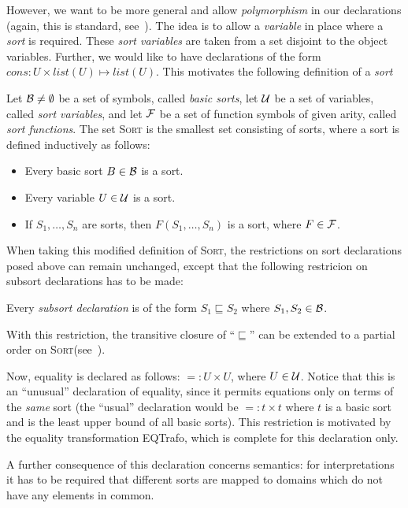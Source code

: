 \documentclass[fleqn]{scrartcl}
\newcommand{\eqtrafo}{\textsf{EQTrafo}\xspace}
\newcommand{\sort}{\textsc{Sort}\xspace}
\begin{document}
However, we want to be more general and allow
{\em polymorphism\/} in our declarations (again, this is standard,
see~\cite{Beierle}). 
The idea is to  allow a {\em variable\/}
in place where a {\em sort\/} is required. These {\em sort variables\/} are
taken from a set disjoint to the object variables. Further, we would
like to have declarations of the form $cons: U \times list(U) \mapsto
list(U)$. This motivates the following definition of a {\em sort\/}
\begin{definition}
Let $\cal B \neq \emptyset$  be a set of symbols, called {\em basic sorts\/}, let $\cal U$
be a set of variables, called {\em sort variables\/}, and let $\cal F$
be a set of function symbols 
of given arity, called {\em sort functions\/}. 
The set \sort is the smallest set consisting of sorts, where a sort
is defined inductively as follows:
\begin{itemize}
\item Every basic sort $B \in {\cal B}$ is a sort.
\item Every variable $U \in {\cal U}$ is a sort.
\item If $S_1,\ldots,S_n$ are sorts, then $F(S_1,\ldots,S_n)$ is a sort,
  where $F \in {\cal F}$.
\end{itemize}
\end{definition}

When taking this modified definition of \sort, the restrictions on
sort declarations posed above can remain unchanged, except 
that the following  restricion on subsort declarations has to be made:
\begin{description}
\item Every  {\em subsort declaration\/} is of the form $S_1
  \sqsubseteq S_2$ where $S_1,S_2 \in {\cal B}$.
\end{description}
With this restriction, the transitive closure of ``$\sqsubseteq$''
can be extended to a partial order on \sort (see~\cite{Beierle}).

Now, equality is declared as follows: ${} = {} : U \times U$, where
$U \in {\cal U}$. Notice that this is an ``unusual'' declaration of
equality, since it permits equations only on terms of the {\em same\/}
sort (the ``usual'' declaration would be ${} = {} : t \times t$
where $t$ is a basic sort and is the least upper bound of all basic
sorts). This restriction is motivated by the equality transformation
\eqtrafo, which is complete for this declaration only.

A further consequence of this declaration concerns semantics: for
interpretations it has
to be required that different sorts are mapped to domains which do not
have any elements in common. 
\end{document}
